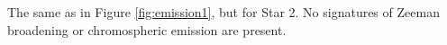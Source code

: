 \label{fig:emission2} The same as in Figure \ref{fig:emission1}, but for Star 2. No signatures of Zeeman broadening or chromospheric emission are present.